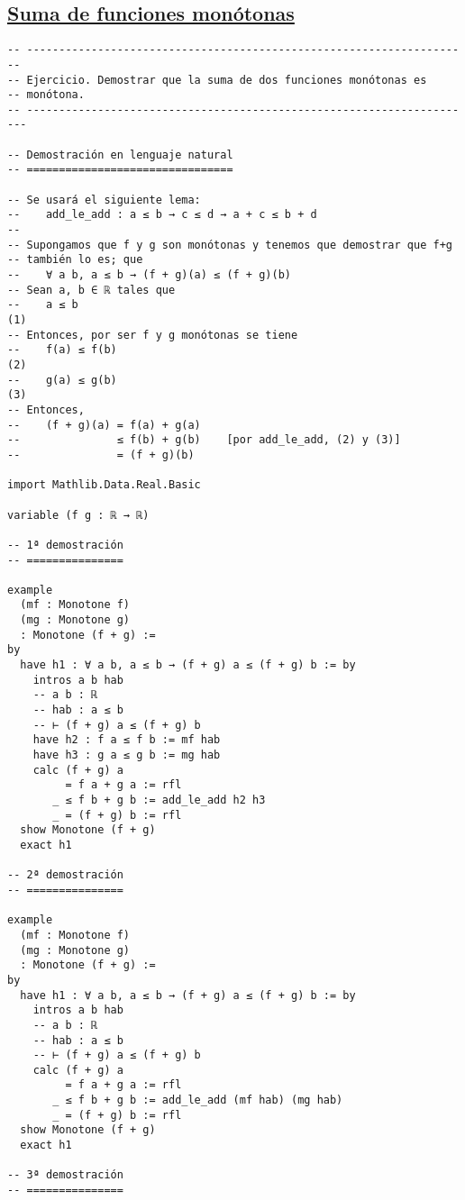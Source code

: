 \subsection{\href{./src/Logica/Suma\_de\_funciones\_monotonas.lean}{Suma de funciones monótonas}}
\label{sec:orgdb81b8a}
\begin{verbatim}
-- ---------------------------------------------------------------------
-- Ejercicio. Demostrar que la suma de dos funciones monótonas es
-- monótona.
-- ----------------------------------------------------------------------

-- Demostración en lenguaje natural
-- ================================

-- Se usará el siguiente lema:
--    add_le_add : a ≤ b → c ≤ d → a + c ≤ b + d
--
-- Supongamos que f y g son monótonas y tenemos que demostrar que f+g
-- también lo es; que
--    ∀ a b, a ≤ b → (f + g)(a) ≤ (f + g)(b)
-- Sean a, b ∈ ℝ tales que
--    a ≤ b                                                          (1)
-- Entonces, por ser f y g monótonas se tiene
--    f(a) ≤ f(b)                                                    (2)
--    g(a) ≤ g(b)                                                    (3)
-- Entonces,
--    (f + g)(a) = f(a) + g(a)
--               ≤ f(b) + g(b)    [por add_le_add, (2) y (3)]
--               = (f + g)(b)

import Mathlib.Data.Real.Basic

variable (f g : ℝ → ℝ)

-- 1ª demostración
-- ===============

example
  (mf : Monotone f)
  (mg : Monotone g)
  : Monotone (f + g) :=
by
  have h1 : ∀ a b, a ≤ b → (f + g) a ≤ (f + g) b := by
    intros a b hab
    -- a b : ℝ
    -- hab : a ≤ b
    -- ⊢ (f + g) a ≤ (f + g) b
    have h2 : f a ≤ f b := mf hab
    have h3 : g a ≤ g b := mg hab
    calc (f + g) a
         = f a + g a := rfl
       _ ≤ f b + g b := add_le_add h2 h3
       _ = (f + g) b := rfl
  show Monotone (f + g)
  exact h1

-- 2ª demostración
-- ===============

example
  (mf : Monotone f)
  (mg : Monotone g)
  : Monotone (f + g) :=
by
  have h1 : ∀ a b, a ≤ b → (f + g) a ≤ (f + g) b := by
    intros a b hab
    -- a b : ℝ
    -- hab : a ≤ b
    -- ⊢ (f + g) a ≤ (f + g) b
    calc (f + g) a
         = f a + g a := rfl
       _ ≤ f b + g b := add_le_add (mf hab) (mg hab)
       _ = (f + g) b := rfl
  show Monotone (f + g)
  exact h1

-- 3ª demostración
-- ===============


\end{verbatim}
